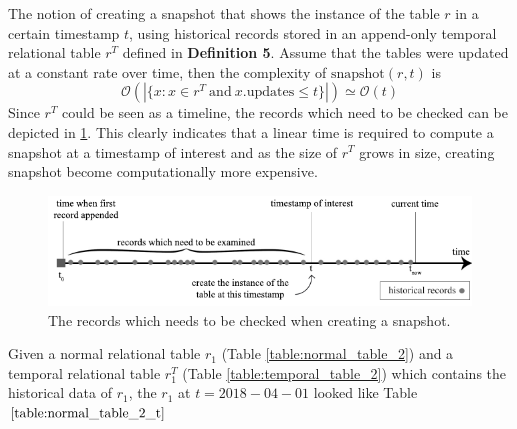 \begin{prop}
	The notion of creating a snapshot that shows the instance of the table $r$ in a certain timestamp $t$, using historical records stored in an append-only temporal relational table $r^T$ defined in \textbf{Definition 5}. Assume that the tables were updated at a constant rate over time, then the complexity of $\mathrm{snapshot}(r, t)$ is $$\mathcal{O}(|\{x: x\in r^T\mathrm{\ and\ } x.\mathrm{updates} \leq t\}|)\simeq \mathcal{O}(t)$$ 
	Since $r^T$ could be seen as a timeline, the records which need to be checked can be depicted in \ref{fig:checked_records}. This clearly indicates that a linear time is required to compute a snapshot at a timestamp of interest and as the size of $r^T$ grows in size, creating snapshot become computationally more expensive.
\label{prop:linear_time}
\end{prop}

\begin{figure}[b]
	\centering
	\includegraphics[width=\textwidth]{figs/tobechecked_records.pdf}
	\caption{The records which needs to be checked when creating a snapshot.}
	\label{fig:checked_records}
\end{figure}

\begin{example}
	Given a normal relational table $r_1$ (Table \ref{table:normal_table_2}) and a temporal relational table $r_1^T$ (Table \ref{table:temporal_table_2}) which contains the historical data of $r_1$, the $r_1$ at $t=2018-04-01$ looked like Table $\ref{table:normal_table_2_t}$
\label{example:snapshot_table}
\end{example}

